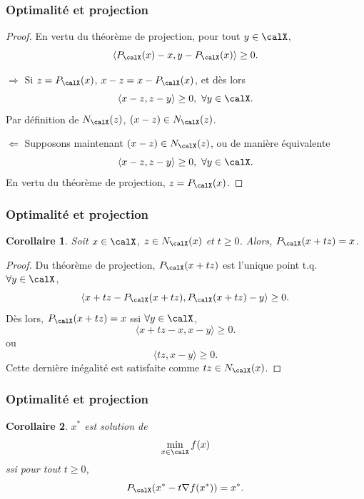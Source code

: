 \documentclass[t,aspectratio=169,usepdftitle=false]{beamer}
\newtheorem{coro}{Corollaire}
\def\cX{\calX}
\begin{document}
\begin{frame}
\frametitle{Optimalité et projection}

\begin{proof}
En vertu du théorème de projection, pour tout $y \in \cX$,
$$
\langle P_{\cX}(x)-x, y-P_{\cX}(x) \rangle \geq 0.
$$

$\boxed{\Rightarrow}$ Si $z = P_{\cX}(x)$, $x-z = x - P_{\cX}(x)$, et dès lors
$$
\langle x-z, z-y \rangle \geq 0,\ \forall y \in \cX.
$$
Par définition de $N_{\cX}(z)$, $(x-z) \in N_{\cX}(z)$.

\mbox{}

$\boxed{\Leftarrow}$ Supposons maintenant $(x-z) \in N_{\cX}(z)$, ou de manière équivalente
$$
\langle x-z, z-y \rangle \geq 0,\ \forall y \in \cX.
$$
En vertu du théorème de projection, $z = P_{\cX}(x)$.
\end{proof}

\end{frame}

\begin{frame}
\frametitle{Optimalité et projection}

\begin{coro}
Soit $x \in \cX$, $z \in N_{\cX}(x)$ et $t \geq 0$. Alors, $P_{\cX}(x + tz) = x$.
\end{coro}



\begin{proof}
Du théorème de projection, $P_{\cX}(x + tz)$ est l'unique point t.q. $\forall y \in \cX$,
$$
\langle x + tz - P_{\cX}(x + tz), P_{\cX}(x + tz) - y \rangle \geq 0.
$$
Dès lors, $P_{\cX}(x + tz) = x$ ssi $\forall y \in \cX$,
$$
\langle x + tz - x, x - y \rangle \geq 0.
$$
ou
$$
\langle tz, x - y \rangle \geq 0.
$$
Cette dernière inégalité est satisfaite comme $tz \in N_{\cX}(x)$.
\end{proof}

\end{frame}

\begin{frame}
\frametitle{Optimalité et projection}

\begin{coro}
$x^*$ est solution de
$$
\min_{x \in \cX} f(x)
$$
ssi pour tout $t \geq 0$,
$$
P_{\cX}(x^* - t\nabla f(x^*)) = x^*.
$$
\end{coro}

\end{frame}
\end{document}
